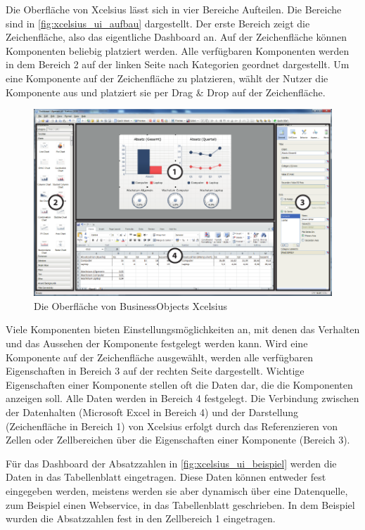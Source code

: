 \begin{onehalfspacing}
Die Oberfläche von \gls{Xcelsius} lässt sich in vier Bereiche Aufteilen. Die Bereiche sind in \vref{fig:xcelsius_ui_aufbau} dargestellt. Der erste Bereich zeigt die Zeichenfläche, also das eigentliche Dashboard an. Auf der Zeichenfläche können Komponenten beliebig platziert werden. Alle verfügbaren Komponenten werden in dem Bereich 2 auf der linken Seite nach Kategorien geordnet dargestellt. Um eine Komponente auf der Zeichenfläche zu platzieren, wählt der Nutzer die Komponente aus und platziert sie per Drag \& Drop auf der Zeichenfläche. 

\begin{figure}[!ht]
\centering
\setlength{\unitlength}{1mm}
\includegraphics[width=15cm]{images/Abbildung5-Xcelsius-Oberflaeche-AI.pdf}
\caption{Die Oberfläche von BusinessObjects Xcelsius\label{fig:xcelsius_ui_aufbau}}
\end{figure}

Viele Komponenten bieten Einstellungsmöglichkeiten an, mit denen das Verhalten und das Aussehen der Komponente festgelegt werden kann. Wird eine Komponente auf der Zeichenfläche ausgewählt, werden alle verfügbaren Eigenschaften in Bereich 3 auf der rechten Seite dargestellt. Wichtige Eigenschaften einer Komponente stellen oft die Daten dar, die die Komponenten anzeigen soll. Alle Daten werden in Bereich 4 festgelegt. Die Verbindung zwischen der Datenhalten (Microsoft Excel in Bereich 4) und der Darstellung (Zeichenfläche in Bereich 1) von \gls{Xcelsius} erfolgt durch das Referenzieren von Zellen oder Zellbereichen über die Eigenschaften einer Komponente (Bereich 3).

Für das Dashboard der Absatzzahlen in \vref{fig:xcelsius_ui_beispiel} werden die Daten in das Tabellenblatt eingetragen. Diese Daten können entweder fest eingegeben werden, meistens werden sie aber dynamisch über eine Datenquelle, zum Beispiel einen Webservice, in das Tabellenblatt geschrieben. In dem Beispiel wurden die Absatzzahlen fest in den Zellbereich 1 eingetragen. 


\end{onehalfspacing}
